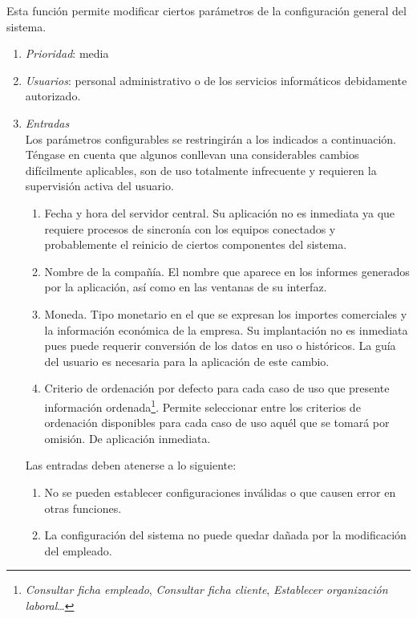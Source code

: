 

  \label{fun:configSystem}
	Esta función permite modificar ciertos parámetros de la configuración general del sistema.

	\begin{enumerate}
		\item \textit{Prioridad}: media
		\item \textit{Usuarios}: personal administrativo o de los servicios informáticos debidamente autorizado.
		\item \textit{Entradas} \\

			Los parámetros configurables se restringirán a los indicados a continuación. Téngase en cuenta que algunos conllevan una considerables cambios difícilmente aplicables, son de uso totalmente infrecuente y requieren la supervisión activa del usuario.
			\begin{enumerate}
				\item Fecha y hora del servidor central. Su aplicación no es inmediata ya que requiere procesos de sincronía con los equipos conectados y probablemente el reinicio de ciertos componentes del sistema.
				\item Nombre de la compañía. El nombre que aparece en los informes generados por la aplicación, así como en las ventanas de su interfaz.
				\item Moneda. Tipo monetario en el que se expresan los importes comerciales y la información económica de la empresa. Su implantación no es inmediata pues puede requerir conversión de los datos en uso o históricos. La guía del usuario es necesaria para la aplicación de este cambio.
				\item Criterio de ordenación por defecto para cada caso de uso que presente información ordenada\footnote{\textit{Consultar ficha empleado}, \textit{Consultar ficha cliente}, \textit{Establecer organización laboral}\ldots}. Permite seleccionar entre los criterios de ordenación disponibles para cada caso de uso aquél que se tomará por omisión. De aplicación inmediata.
			\end{enumerate}

			Las entradas deben atenerse a lo siguiente:
			\begin{enumerate}
				\item No se pueden establecer configuraciones inválidas o que causen error en otras funciones.
				\item La configuración del sistema no puede quedar dañada por la modificación del empleado.
			\end{enumerate}


\end{enumerate}
